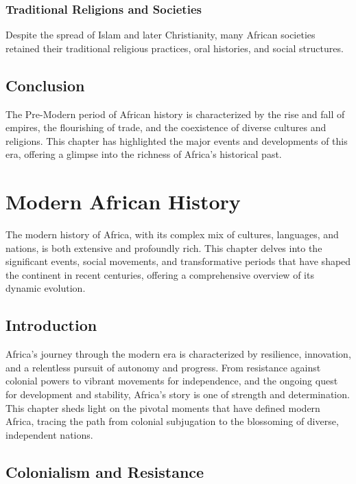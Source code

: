 \documentclass{book}
\begin{document}
\subsection{Traditional Religions and Societies}
Despite the spread of Islam and later Christianity, many African societies retained their traditional religious practices, oral histories, and social structures.

\section{Conclusion}
\label{sec:conclusion-pre-modern-africa}

The Pre-Modern period of African history is characterized by the rise and fall of empires, the flourishing of trade, and the coexistence of diverse cultures and religions. This chapter has highlighted the major events and developments of this era, offering a glimpse into the richness of Africa's historical past.

\chapter{Modern African History}
\label{ch:modern-african-history}

The modern history of Africa, with its complex mix of cultures, languages, and nations, is both extensive and profoundly rich. This chapter delves into the significant events, social movements, and transformative periods that have shaped the continent in recent centuries, offering a comprehensive overview of its dynamic evolution.

\section{Introduction}
\label{sec:introduction-modern-africa}

Africa’s journey through the modern era is characterized by resilience, innovation, and a relentless pursuit of autonomy and progress. From resistance against colonial powers to vibrant movements for independence, and the ongoing quest for development and stability, Africa’s story is one of strength and determination. This chapter sheds light on the pivotal moments that have defined modern Africa, tracing the path from colonial subjugation to the blossoming of diverse, independent nations.

\section{Colonialism and Resistance}
\label{sec:colonialism-and-resistance}
\end{document}
